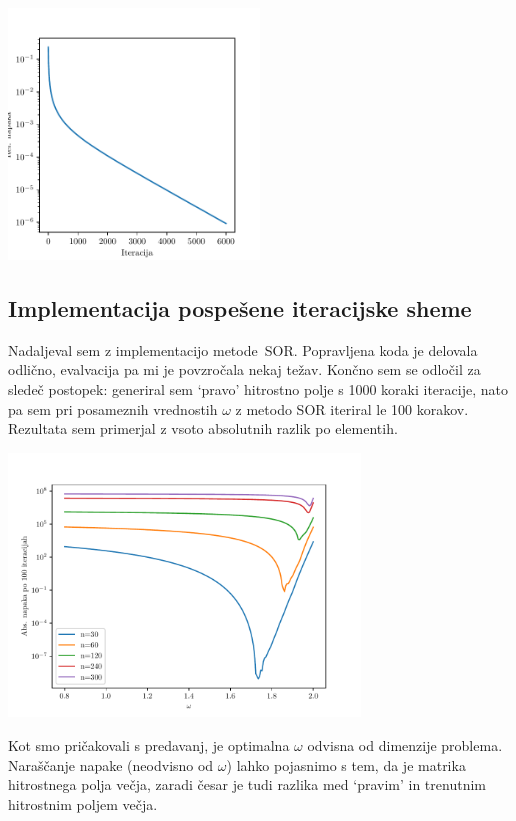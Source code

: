 \begin{center}
    \includegraphics[width=0.5\textwidth]{../old/1-errors.pdf}
\end{center}
\subsection{Implementacija pospešene iteracijske sheme}
Nadaljeval sem z implementacijo metode~SOR. Popravljena koda je delovala odlično, evalvacija pa mi je povzročala nekaj težav. Končno sem se odločil za sledeč postopek: generiral sem `pravo' hitrostno polje s 1000 koraki iteracije, nato pa sem pri posameznih vrednostih $\omega$ z metodo SOR iteriral le 100 korakov. Rezultata sem primerjal z vsoto absolutnih razlik po elementih.
\begin{center}
    \includegraphics[width=0.7\textwidth]{../old/1-omegas.pdf}
\end{center}
Kot smo pričakovali s predavanj, je optimalna $\omega$ odvisna od dimenzije problema. Naraščanje napake (neodvisno od $\omega$) lahko pojasnimo s tem, da je matrika hitrostnega polja večja, zaradi česar je tudi razlika med `pravim' in trenutnim hitrostnim poljem večja.

